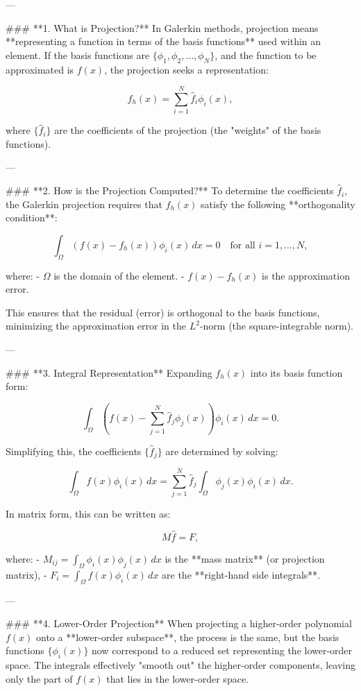---

### **1. What is Projection?**
In Galerkin methods, projection means **representing a function in terms of the basis functions** used within an element. If the basis functions are \(\{\phi_1, \phi_2, \dots, \phi_N\}\), and the function to be approximated is \(f(x)\), the projection seeks a representation:

\[
f_h(x) = \sum_{i=1}^N \hat{f}_i \phi_i(x),
\]

where \(\{\hat{f}_i\}\) are the coefficients of the projection (the "weights" of the basis functions).

---

### **2. How is the Projection Computed?**
To determine the coefficients \(\hat{f}_i\), the Galerkin projection requires that \(f_h(x)\) satisfy the following **orthogonality condition**:

\[
\int_\Omega \left(f(x) - f_h(x)\right) \phi_i(x) \, dx = 0 \quad \text{for all } i = 1, \dots, N,
\]

where:
- \(\Omega\) is the domain of the element.
- \(f(x) - f_h(x)\) is the approximation error.

This ensures that the residual (error) is orthogonal to the basis functions, minimizing the approximation error in the \(L^2\)-norm (the square-integrable norm).

---

### **3. Integral Representation**
Expanding \(f_h(x)\) into its basis function form:

\[
\int_\Omega \left(f(x) - \sum_{j=1}^N \hat{f}_j \phi_j(x)\right) \phi_i(x) \, dx = 0.
\]

Simplifying this, the coefficients \(\{\hat{f}_j\}\) are determined by solving:

\[
\int_\Omega f(x) \phi_i(x) \, dx = \sum_{j=1}^N \hat{f}_j \int_\Omega \phi_j(x) \phi_i(x) \, dx.
\]

In matrix form, this can be written as:

\[
M \hat{f} = F,
\]

where:
- \(M_{ij} = \int_\Omega \phi_i(x) \phi_j(x) \, dx\) is the **mass matrix** (or projection matrix),
- \(F_i = \int_\Omega f(x) \phi_i(x) \, dx\) are the **right-hand side integrals**.

---

### **4. Lower-Order Projection**
When projecting a higher-order polynomial \(f(x)\) onto a **lower-order subspace**, the process is the same, but the basis functions \(\{\phi_i(x)\}\) now correspond to a reduced set representing the lower-order space. The integrals effectively "smooth out" the higher-order components, leaving only the part of \(f(x)\) that lies in the lower-order space.


